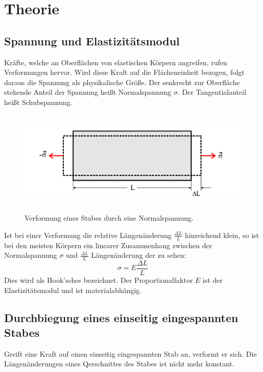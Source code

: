 \section{Theorie}
\label{sec:Theorie}

\subsection{Spannung und Elastizitätsmodul}
Kräfte, welche an Oberflächen von elastischen Körpern angreifen, rufen Verformungen
hervor. Wird diese Kraft auf die Flächeneinheit bezogen, folgt daraus die
Spannung als physikalische Größe. Der senkrecht zur Oberfläche stehende Anteil der
Spannung heißt Normalspannung $\sigma$. Der Tangentialanteil heißt Schubspannung.

\begin{figure}[H]
  \centering
  \includegraphics[height=5cm]{biegungbild1.PNG}
  \caption{Verformung eines Stabes durch eine Normalspannung. \cite{sample}}
  \label{fig:biegungbild1}
\end{figure}

Ist bei einer Verformung die relative Längenänderung $\frac{\Delta L}{L}$ hinreichend klein, so ist
bei den meisten Körpern ein linearer Zusammenhang zwischen
der Normalspannung $\sigma$ und $\frac{\Delta L}{L}$ Längenänderung der zu sehen:
\begin{equation}
  \sigma = E\frac{\Delta L}{L}
\end{equation}
Dies wird als Hook'sches bezeichnet. Der Proportionalfaktor $E$ ist
der Elastizitätsmodul und ist materialabhängig.

\subsection{Durchbiegung eines einseitig eingespannten Stabes}
Greift eine Kraft auf einen einseitig eingespannten Stab an, verformt er sich.
Die Längenänderungen eines Qerschnittes des Stabes ist nicht mehr konstant.

